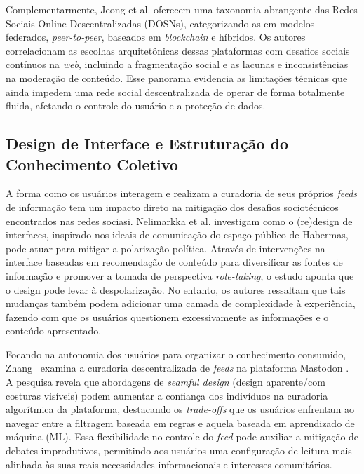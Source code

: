\documentclass[conference]{IEEEtran} \IEEEoverridecommandlockouts %
\begin{document}
Complementarmente, Jeong et al. \cite{jeongNavigatingDecentralizedOnline2025} oferecem uma taxonomia abrangente das Redes Sociais Online Descentralizadas (DOSNs), categorizando-as em modelos federados, \textit{peer-to-peer}, baseados em \textit{blockchain} e híbridos. Os autores correlacionam as escolhas arquitetônicas dessas plataformas com desafios sociais contínuos na \textit{web}, incluindo a fragmentação social e as lacunas e inconsistências na moderação de conteúdo. Esse panorama evidencia as limitações técnicas que ainda impedem uma rede social descentralizada de operar de forma totalmente fluida, afetando o controle do usuário e a proteção de dados.



\subsection{Design de Interface e Estruturação do Conhecimento Coletivo}

A forma como os usuários interagem e realizam a curadoria de seus próprios \textit{feeds} de informação tem um impacto direto na mitigação dos desafios sociotécnicos encontrados nas redes sociasi. Nelimarkka et al. \cite{nelimarkkaReDesignMitigatePolitical2019} investigam como o (re)design de interfaces, inspirado nos ideais de comunicação do espaço público de Habermas, pode atuar para mitigar a polarização política. Através de intervenções na interface baseadas em recomendação de conteúdo para diversificar as fontes de informação e promover a tomada de perspectiva \textit{role-taking}, o estudo aponta que o design pode levar à despolarização. No entanto, os autores ressaltam que tais mudanças também podem adicionar uma camada de complexidade à experiência, fazendo com que os usuários questionem excessivamente as informações e o conteúdo apresentado.

Focando na autonomia dos usuários para organizar o conhecimento consumido, Zhang~\cite{zhangAttitudesImaginedRoles2026} examina a curadoria descentralizada de \textit{feeds} na plataforma Mastodon . A pesquisa revela que abordagens de \textit{seamful design} (design aparente/com costuras visíveis) podem aumentar a confiança dos indivíduos na curadoria algorítmica da plataforma, destacando os \textit{trade-offs} que os usuários enfrentam ao navegar entre a filtragem baseada em regras e aquela baseada em aprendizado de máquina (ML). Essa flexibilidade no controle do \textit{feed} pode auxiliar a mitigação de debates improdutivos, permitindo aos usuários uma configuração de leitura mais alinhada às suas reais necessidades informacionais e interesses comunitários.
\end{document}
